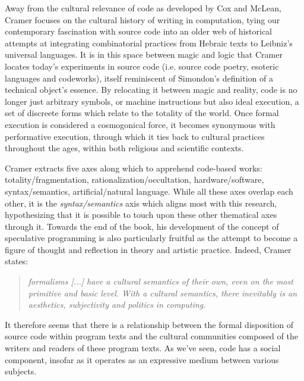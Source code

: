 Away from the cultural relevance of code as developed by Cox and McLean, Cramer focuses on the cultural history of writing in computation, tying our contemporary fascination with source code into an older web of historical attempts at integrating combinatorial practices from Hebraic texts to Leibniz's universal languages\cite{cramer_words_2003}. It is in this space between magic and logic that Cramer locates today's experiments in source code (i.e. source code poetry, esoteric languages and codeworks), itself reminiscent of Simondon's definition of a technical object's essence\cite{simondon_du_1958}. By relocating it between magic and reality, code is no longer just arbitrary symbols, or machine instructions but also ideal execution, a set of discreete forms which relate to the totality of the world. Once formal execution is considered a cosmogonical force, it becomes synonymous with performative execution, through which it ties back to cultural practices throughout the ages, within both religious and scientific contexts.

Cramer extracts five axes along which to apprehend code-based works: totality/fragmentation, rationalization/occultation, hardware/software, syntax/semantics, artificial/natural language. While all these axes overlap each other, it is the \emph{syntax/semantics} axis which aligns most with this research, hypothesizing that it is possible to touch upon these other thematical axes through it. Towards the end of the book, his development of the concept of speculative programming is also particularly fruitful as the attempt to become a figure of thought and reflection in theory and artistic practice. Indeed, Cramer states:

\begin{quote}
    \emph{formalisms [...] have a cultural semantics of their own, even on the most primitive and basic level. With a cultural semantics, there inevitably is an aesthetics, subjectivity and politics in computing.}\cite{cramer_words_2003}
\end{quote}

It therefore seems that there is a relationship between the formal disposition of source code within program texts and the cultural communities composed of the writers and readers of these program texts. As we've seen, code has a social component, insofar as it operates as an expressive medium between various subjects.

